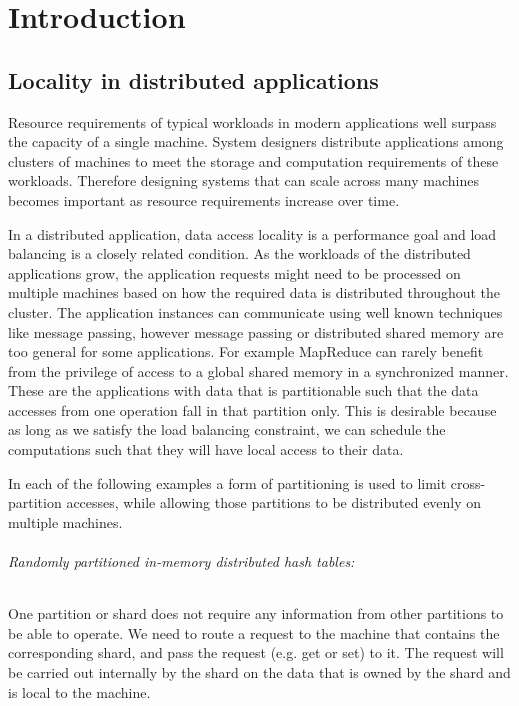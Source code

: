 \chapter{Introduction}
\label{chap:introduction}

\section{Locality in distributed applications}
Resource requirements of typical workloads in modern applications well surpass the
capacity of a single machine. System designers distribute applications among clusters of
machines to
meet the storage and computation requirements of these workloads. Therefore
designing systems that can scale across many machines becomes important as
resource requirements increase over time.

In a distributed application, data access locality is a performance goal
and load balancing is a closely related condition.
As the workloads of the distributed applications grow, the application
requests might need to be processed on multiple machines based on how the 
required data is distributed throughout the cluster. The application instances
can communicate using well known techniques like message passing, however
message passing or
distributed shared memory are too general for some applications. For example
MapReduce \cite{dean2008mapreduce} can rarely benefit from the privilege of
access to a global
shared memory in a synchronized manner. These are the applications with
data that is partitionable such that the data accesses from one operation
fall in that partition only. This is desirable because as long as we
satisfy the load balancing constraint, we can schedule the computations
such that they will have local access to their data.

In each of the following examples a form of partitioning is used to limit
cross-partition accesses, while allowing those partitions to be
distributed evenly on multiple machines.
\subparagraph{Randomly partitioned in-memory distributed hash tables:} One partition or shard
    does not require any information from other partitions to be able to
    operate. We need to route a request to the machine that contains the
    corresponding shard,
    and pass the request (e.g. get or set) to it. The
    request will be carried out internally by the shard on the data that
    is owned by the shard and is local to the machine.

